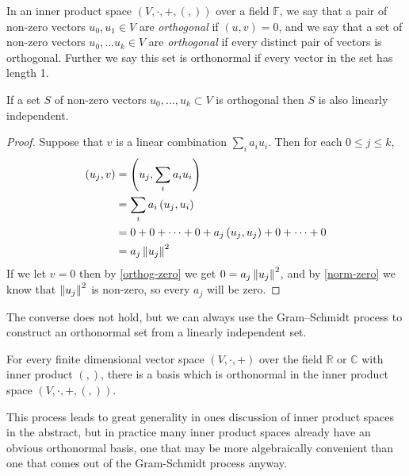 \begin{define}
	In an inner product space $(V, \cdot, +, (,))$ over a field $\mathbb{F}$, we say that a pair of non-zero vectors $u_0, u_1 \in V$ are \emph{orthogonal} if $(u,v) = 0$, and we say that a set of non-zero vectors $u_0, \dots u_k \in V$ are \emph{orthogonal} if every distinct pair of vectors is orthogonal. Further we say this set is orthonormal if every vector in the set has length 1.
\end{define}

\begin{prop}\label{orthog-independent}
	If a set $S$ of non-zero vectors $u_0,\dots,u_k \subset V$ is orthogonal then $S$ is also linearly independent.
\end{prop}
\begin{proof}
	Suppose that $v$ is a linear combination $\sum_i a_iu_i$. Then for each $0 \leq j \leq k$,
	\begin{align*}
		(u_j,v)
		&= \left(u_j,\sum_i a_iu_i\right)
		\\&= \sum_i a_i\left(u_j,u_i\right)
		\\&= 0 + 0 + \dots + 0 + a_j\left(u_j,u_j\right) + 0 + \dots + 0
		\\&= a_j\left\Vert u_j \right\Vert^2
	\end{align*}
	If we let $v = 0$ then by \autoref{orthog-zero} we get $0 = a_j\left\Vert u_j \right\Vert^2$, and by \autoref{norm-zero} we know that $\left\Vert u_j \right\Vert^2$ is non-zero, so every $a_j$ will be zero.
\end{proof}

The converse does not hold, but we can always use the Gram–Schmidt process to construct an orthonormal set from a linearly independent set.

\begin{prop}
	For every finite dimensional vector space $(V, \cdot, +)$ over the field $\mathbb{R}$ or $\mathbb{C}$ with inner product $(,)$, there is a basis which is orthonormal in the inner product space $(V, \cdot, +, (,))$.
\end{prop}
This process leads to great generality in ones discussion of inner product spaces in the abstract, but in practice many inner product spaces already have an obvious orthonormal basis, one that may be more algebraically convenient than one that comes out of the Gram-Schmidt process anyway.

